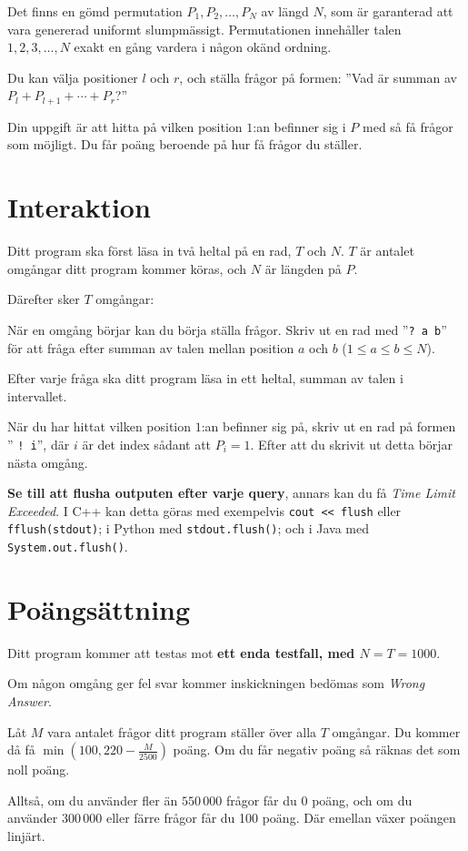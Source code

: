 
Det finns en gömd permutation $P_{1},P_{2},\ldots,P_{N}$ av längd $N$, som är garanterad att vara genererad uniformt slumpmässigt.
Permutationen innehåller talen $1, 2, 3, \ldots, N$ exakt en gång vardera i någon okänd ordning.

Du kan välja positioner $l$ och $r$, och ställa frågor på formen: ''Vad är summan av $P_l + P_{l+1} + \cdots + P_r$?''

Din uppgift är att hitta på vilken position $1$:an befinner sig i $P$ med så få frågor som möjligt.
Du får poäng beroende på hur få frågor du ställer.

\section*{Interaktion}

Ditt program ska först läsa in två heltal på en rad, $T$ och $N$. 
$T$ är antalet omgångar ditt program kommer köras, och $N$ är längden på $P$.

Därefter sker $T$ omgångar:

När en omgång börjar kan du börja ställa frågor. Skriv ut en rad med ''\verb|? a b|'' för
att fråga efter summan av talen mellan position $a$ och $b$ ($1 \leq a \leq b \leq N$).

Efter varje fråga ska ditt program läsa in ett heltal, summan av talen i intervallet.

När du har hittat vilken position $1$:an befinner sig på, skriv ut en rad på formen ''  \verb|! i|'',
där $i$ är det index sådant att $P_i = 1$. Efter att du skrivit ut detta börjar nästa omgång.

\textbf{Se till att flusha outputen efter varje query}, annars kan du få \textit{Time Limit Exceeded}.
I C++ kan detta göras med exempelvis \texttt{cout << flush}
eller \texttt{fflush(stdout)};
i Python med \texttt{stdout.flush()};
och i Java med \texttt{System.out.flush()}.

\section*{Poängsättning}

Ditt program kommer att testas mot \textbf{ett enda testfall, med $N = T = 1000$}.

Om någon omgång ger fel svar kommer inskickningen bedömas som \textit{Wrong Answer}.

Låt $M$ vara antalet frågor ditt program ställer över alla $T$ omgångar. Du kommer då få
$\min(100, 220 - \frac{M}{2500})$ poäng. Om du får negativ poäng så räknas det som noll poäng.

Alltså, om du använder fler än $550\,000$ frågor får du 0 poäng, och
om du använder $300\,000$ eller färre frågor får du 100 poäng. Där emellan växer poängen linjärt.
